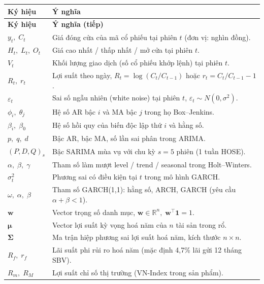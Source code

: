 \documentclass[12pt,a4paper,openany,oneside]{report}
\numberwithin{equation}{chapter}
\begin{document}
\renewcommand{\arraystretch}{1.3}
\setlength{\tabcolsep}{4pt}
{\small
\begin{longtable}{|>{\raggedright\arraybackslash}p{3.3cm}|>{\raggedright\arraybackslash}p{11.5cm}|}
\hline
\textbf{Ký hiệu} & \textbf{Ý nghĩa} \\
\hline\endfirsthead
\hline
\textbf{Ký hiệu} & \textbf{Ý nghĩa (tiếp)} \\
\hline\endhead
\hline\endfoot
$y_t,\; C_t$ & Giá đóng cửa của mã cổ phiếu tại phiên $t$ (đơn vị: nghìn đồng). \\
\hline
$H_t,\; L_t,\; O_t$ & Giá cao nhất / thấp nhất / mở cửa tại phiên $t$. \\
\hline
$V_t$ & Khối lượng giao dịch (số cổ phiếu khớp lệnh) tại phiên $t$. \\
\hline
$R_t,\; r_t$ & Lợi suất theo ngày, $R_t = \log(C_t/C_{t-1})$ hoặc $r_t = C_t/C_{t-1}-1$. \\
\hline
$\varepsilon_t$ & Sai số ngẫu nhiên (white noise) tại phiên $t$, $\varepsilon_t \sim N(0,\sigma^2)$. \\
\hline
$\phi_i,\; \theta_j$ & Hệ số AR bậc $i$ và MA bậc $j$ trong họ Box--Jenkins. \\
\hline
$\beta_i,\; \beta_0$ & Hệ số hồi quy của biến độc lập thứ $i$ và hằng số. \\
\hline
$p,\; q,\; d$ & Bậc AR, bậc MA, số lần sai phân trong ARIMA. \\
\hline
$(P,D,Q)_s$ & Bậc SARIMA mùa vụ với chu kỳ $s = 5$ phiên (1 tuần HOSE). \\
\hline
$\alpha,\;\beta,\;\gamma$ & Tham số làm mượt level / trend / seasonal trong Holt--Winters. \\
\hline
$\sigma_t^2$ & Phương sai có điều kiện tại $t$ trong mô hình GARCH. \\
\hline
$\omega,\;\alpha,\;\beta$ & Tham số GARCH(1,1): hằng số, ARCH, GARCH (yêu cầu $\alpha+\beta<1$). \\
\hline
$\mathbf{w}$ & Vector trọng số danh mục, $\mathbf{w} \in \mathbb{R}^n,\; \mathbf{w}^{\!\top}\mathbf{1}=1$. \\
\hline
$\boldsymbol{\mu}$ & Vector lợi suất kỳ vọng hoá năm của $n$ tài sản trong rổ. \\
\hline
$\boldsymbol{\Sigma}$ & Ma trận hiệp phương sai lợi suất hoá năm, kích thước $n\times n$. \\
\hline
$R_f,\; r_f$ & Lãi suất phi rủi ro hoá năm (mặc định 4{,}7\% lãi gửi 12 tháng SBV). \\
\hline
$R_m,\; R_M$ & Lợi suất chỉ số thị trường (VN-Index trong sản phẩm). \\

\end{longtable}}
\end{document}
